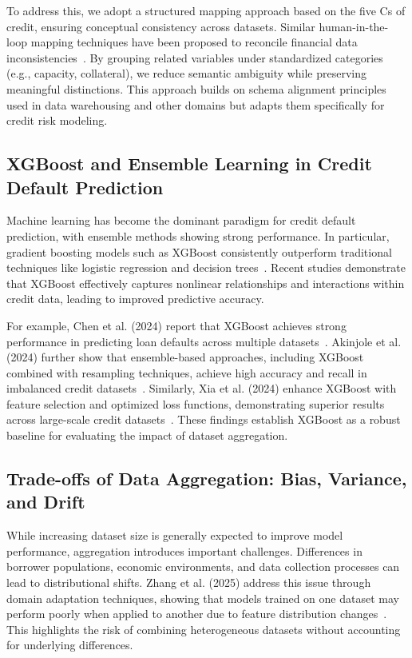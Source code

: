 \documentclass[onecolumn]{IEEEtai}
\begin{document}
To address this, we adopt a structured mapping approach based on the five Cs of credit, ensuring conceptual consistency across datasets. Similar human-in-the-loop mapping techniques have been proposed to reconcile financial data inconsistencies~\cite{9}. By grouping related variables under standardized categories (e.g., capacity, collateral), we reduce semantic ambiguity while preserving meaningful distinctions. This approach builds on schema alignment principles used in data warehousing and other domains but adapts them specifically for credit risk modeling.

\subsection{XGBoost and Ensemble Learning in Credit Default Prediction}

Machine learning has become the dominant paradigm for credit default prediction, with ensemble methods showing strong performance. In particular, gradient boosting models such as XGBoost consistently outperform traditional techniques like logistic regression and decision trees~\cite{10,11,12,15,17}. Recent studies demonstrate that XGBoost effectively captures nonlinear relationships and interactions within credit data, leading to improved predictive accuracy.

For example, Chen et al. (2024) report that XGBoost achieves strong performance in predicting loan defaults across multiple datasets~\cite{7}. Akinjole et al. (2024) further show that ensemble-based approaches, including XGBoost combined with resampling techniques, achieve high accuracy and recall in imbalanced credit datasets~\cite{2}. Similarly, Xia et al. (2024) enhance XGBoost with feature selection and optimized loss functions, demonstrating superior results across large-scale credit datasets~\cite{1}. These findings establish XGBoost as a robust baseline for evaluating the impact of dataset aggregation.

\subsection{Trade-offs of Data Aggregation: Bias, Variance, and Drift}

While increasing dataset size is generally expected to improve model performance, aggregation introduces important challenges. Differences in borrower populations, economic environments, and data collection processes can lead to distributional shifts. Zhang et al. (2025) address this issue through domain adaptation techniques, showing that models trained on one dataset may perform poorly when applied to another due to feature distribution changes~\cite{4}. This highlights the risk of combining heterogeneous datasets without accounting for underlying differences.
\end{document}
